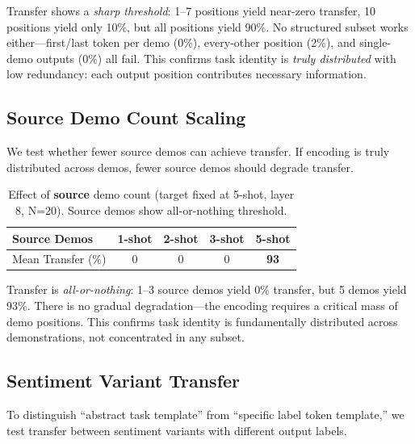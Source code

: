 \documentclass{article}
\begin{document}
Transfer shows a \emph{sharp threshold}: 1--7 positions yield near-zero transfer, 10 positions yield only 10\%, but all positions yield 90\%. No structured subset works either---first/last token per demo (0\%), every-other position (2\%), and single-demo outputs (0\%) all fail. This confirms task identity is \emph{truly distributed} with low redundancy: each output position contributes necessary information.

\subsection{Source Demo Count Scaling}

We test whether fewer source demos can achieve transfer. If encoding is truly distributed across demos, fewer source demos should degrade transfer.

\begin{table}[h]
\centering
\small
\caption{Effect of \textbf{source} demo count (target fixed at 5-shot, layer 8, N=20). Source demos show all-or-nothing threshold.}
\label{tab:source_demos}
\begin{tabular}{@{}lcccc@{}}
\toprule
Source Demos & 1-shot & 2-shot & 3-shot & 5-shot \\
\midrule
Mean Transfer (\%) & 0 & 0 & 0 & \textbf{93} \\
\bottomrule
\end{tabular}
\end{table}

Transfer is \emph{all-or-nothing}: 1--3 source demos yield 0\% transfer, but 5 demos yield 93\%. There is no gradual degradation---the encoding requires a critical mass of demo positions. This confirms task identity is fundamentally distributed across demonstrations, not concentrated in any subset.

\subsection{Sentiment Variant Transfer}

To distinguish ``abstract task template'' from ``specific label token template,'' we test transfer between sentiment variants with different output labels.
\end{document}
